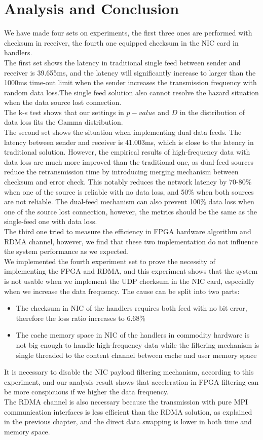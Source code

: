 \documentclass[11pt,openright,a4paper]{report}
\begin{document}
\section{Analysis and Conclusion}
We have made four sets on experiments, the first three ones are performed with checksum in receiver, the fourth one equipped checksum in the NIC card in handlers.\\
The first set shows the latency in traditional single feed between sender and receiver is 39.655ms, and the latency will significantly increase to larger than the 1000ms time-out limit when the sender increases the transmission frequency with random data loss.The single feed solution also cannot resolve the hazard situation when the data source lost connection.\\
The k-s test shows that our settings in $p-value$ and $D$ in the distribution of data loss fits the Gamma distribution.\\
The second set shows the situation when implementing dual data feeds. The latency between sender and receiver is 41.003ms, which is close to the latency in traditional solution. However, the empirical results of high-frequency data with data loss are much more improved than the traditional one, as dual-feed sources reduce the retransmission time by introducing merging mechanism between checksum and error check. This notably reduces the network latency by 70-80\% when one of the source is reliable with no data loss, and 50\% when both sources are not reliable. The dual-feed mechanism can also prevent 100\% data loss when one of the source lost connection, however, the metrics should be the same as the single-feed one with data loss.\\
The third one tried to measure the efficiency in FPGA hardware algorithm and RDMA channel, however, we find that these two implementation do not influence the system performance as we expected.\\
We implemented the fourth experiment set to prove the necessity of implementing the FPGA and RDMA, and this experiment shows that the system is not usable when we implement the UDP checksum in the NIC card, especially when we increase the data frequency. The cause can be split into two parts:
\begin{itemize}
	\item The checksum in NIC of the handlers requires both feed with no bit error, therefore the loss ratio increases to 6.68\%
	\item The cache memory space in NIC of the handlers in commodity hardware is not big enough to handle high-frequency data while the filtering mechanism is single threaded to the content channel between cache and user memory space
\end{itemize} 
It is necessary to disable the NIC payload filtering mechanism, according to this experiment, and our analysis result shows that acceleration in FPGA filtering can be more conspicuous if we higher the data frequency.\\
The RDMA channel is also necessary because the transmission with pure MPI communication interfaces is less efficient than the RDMA solution, as explained in the previous chapter, and the direct data swapping is lower in both time and memory space.
\end{document}
